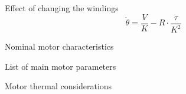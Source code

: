 \documentclass[compress]{beamer}
\begin{document}
{
    \begin{frame}{Effect of changing the windings}
        \[
        \dot\theta = \frac{V}{K} - R \cdot \frac{\tau}{K^2}
        \]
    \vspace{\paperheight}
    \end{frame}
}

%
%

{
    \begin{frame}{Nominal motor characteristics}
    \end{frame}
}

{
    \begin{frame}{List of main motor parameters}
    \end{frame}
}

{
    \begin{frame}{Motor thermal considerations}
    \end{frame}
}
\end{document}
